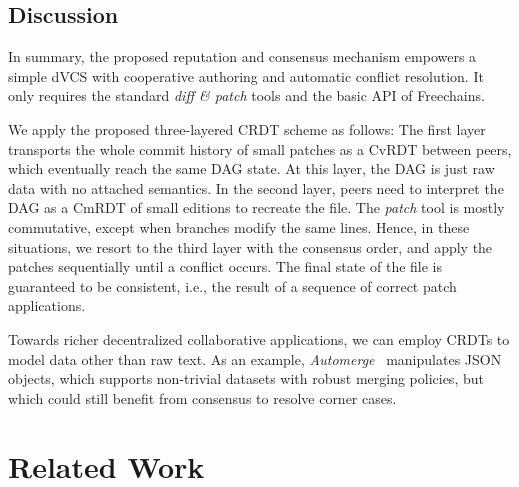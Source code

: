 \documentclass[12pt]{article}
\newcommand{\FC}       {Freechains\xspace}
\begin{document}
\subsection{Discussion}

In summary, the proposed reputation and consensus mechanism empowers a simple
dVCS with cooperative authoring and automatic conflict resolution.
It only requires the standard \emph{diff \& patch} tools and the basic API of
\FC.

We apply the proposed three-layered CRDT scheme as follows:
The first layer transports the whole commit history of small patches as a CvRDT
between peers, which eventually reach the same DAG state.
At this layer, the DAG is just raw data with no attached semantics.
%
In the second layer, peers need to interpret the DAG as a CmRDT of small
editions to recreate the file.
The \emph{patch} tool is mostly commutative, except when branches modify the
same lines.
%
Hence, in these situations, we resort to the third layer with the consensus
order, and apply the patches sequentially until a conflict occurs.
The final state of the file is guaranteed to be consistent, i.e., the result of
a sequence of correct patch applications.

Towards richer decentralized collaborative applications, we can employ CRDTs to
model data other than raw text.
As an example, \emph{Automerge}~\cite{p2p.automerge} manipulates JSON objects,
which supports non-trivial datasets with robust merging policies, but which
could still benefit from consensus to resolve corner cases.

\section{Related Work}
\label{sec.related}

\end{document}
